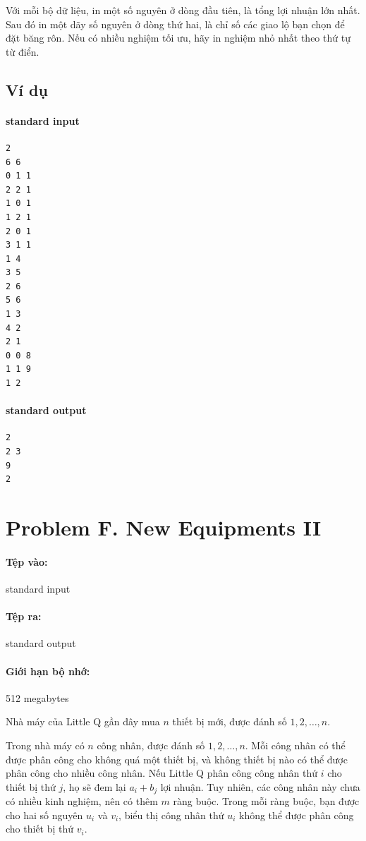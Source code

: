 \documentclass[11pt]{article}
\begin{document}
Với mỗi bộ dữ liệu, in một số nguyên ở dòng đầu tiên, là tổng lợi nhuận lớn
nhất. Sau đó in một dãy số nguyên ở dòng thứ hai, là chỉ số các giao lộ bạn
chọn để đặt băng rôn. Nếu có nhiều nghiệm tối ưu, hãy in nghiệm nhỏ nhất theo
thứ tự từ điển.

\subsection*{Ví dụ}

\paragraph{standard input}
\begin{verbatim}
2
6 6
0 1 1
2 2 1
1 0 1
1 2 1
2 0 1
3 1 1
1 4
3 5
2 6
5 6
1 3
4 2
2 1
0 0 8
1 1 9
1 2
\end{verbatim}

\paragraph{standard output}
\begin{verbatim}
2
2 3
9
2
\end{verbatim}

\section{Problem F. New Equipments II}

\paragraph{Tệp vào:} standard input
\paragraph{Tệp ra:} standard output
\paragraph{Giới hạn bộ nhớ:} 512 megabytes

Nhà máy của Little Q gần đây mua \(n\) thiết bị mới, được đánh số
\(1,2,\ldots,n\).

Trong nhà máy có \(n\) công nhân, được đánh số \(1,2,\ldots,n\). Mỗi công
nhân có thể được phân công cho không quá một thiết bị, và không thiết bị nào
có thể được phân công cho nhiều công nhân. Nếu Little Q phân công công nhân
thứ \(i\) cho thiết bị thứ \(j\), họ sẽ đem lại \(a_i+b_j\) lợi nhuận. Tuy
nhiên, các công nhân này chưa có nhiều kinh nghiệm, nên có thêm \(m\) ràng
buộc. Trong mỗi ràng buộc, bạn được cho hai số nguyên \(u_i\) và \(v_i\),
biểu thị công nhân thứ \(u_i\) không thể được phân công cho thiết bị thứ
\(v_i\).
\end{document}
